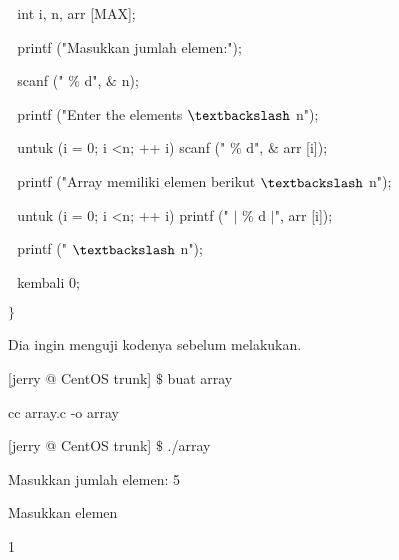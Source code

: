 \noindent 
 \hspace*{0.5in}  $  $ $  $ $  $int i, n, arr [MAX]; \par
\noindent 
 \hspace*{0.5in}  $  $ $  $ $  $printf ("Masukkan jumlah elemen:"); \par
\noindent 
 \hspace*{0.5in}  $  $ $  $ $  $scanf (" $  \%  $ d",  $  \&  $ n); \par
\noindent 
 \hspace*{0.5in}  $  $ $  $ $  $printf ("Enter the elements  $  \textbackslash  $ n"); \par
\noindent 
 \hspace*{0.5in}  $  $ $  $ $  $untuk (i = 0; i <n; ++ i) scanf (" $  \%  $ d",  $  \&  $ arr [i]); \par
\noindent 
 \hspace*{0.5in}  $  $ $  $ $  $printf ("Array memiliki elemen berikut  $  \textbackslash  $ n"); \par
\noindent 
 \hspace*{0.5in}  $  $ $  $ $  $untuk (i = 0; i <n; ++ i) printf (" $  \vert  $ $  \%  $ d  $  \vert  $", arr [i]); \par
\noindent 
 \hspace*{0.5in}  $  $ $  $ $  $printf (" $  \textbackslash  $ n"); \par
\noindent 
 \hspace*{0.5in}  $  $ $  $ $  $kembali 0; \par
\noindent 
 \hspace*{0.5in}  $  \}  $ \par
\vspace{12pt}
\noindent 
Dia ingin menguji kodenya sebelum melakukan. \par
\noindent 
 \hspace*{0.5in} [jerry @ CentOS trunk]  $  \$  $ buat array \par
\noindent 
 \hspace*{0.5in} cc array.c -o array \par
\noindent 
 \hspace*{0.5in} [jerry @ CentOS trunk]  $  \$  $ ./array \par
\noindent 
 \hspace*{0.5in} Masukkan jumlah elemen: 5 \par
\noindent 
 \hspace*{0.5in} Masukkan elemen \par
\noindent 
 \hspace*{0.5in}  \hspace*{0.5in} 1 \par
